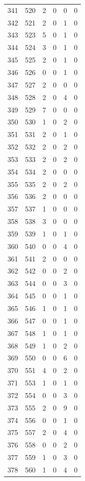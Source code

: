 \documentclass[
  letterpaper,
  DIV=11,
  numbers=noendperiod]{scrreprt}
\begin{document}
\begin{longtable}[]{@{}rrrrrr@{}}
341 & 520 & 2 & 0 & 0 & 0 \\
342 & 521 & 2 & 0 & 1 & 0 \\
343 & 523 & 5 & 0 & 1 & 0 \\
344 & 524 & 3 & 0 & 1 & 0 \\
345 & 525 & 2 & 0 & 1 & 0 \\
346 & 526 & 0 & 0 & 1 & 0 \\
347 & 527 & 2 & 0 & 0 & 0 \\
348 & 528 & 2 & 0 & 4 & 0 \\
349 & 529 & 7 & 0 & 0 & 0 \\
350 & 530 & 1 & 0 & 2 & 0 \\
351 & 531 & 2 & 0 & 1 & 0 \\
352 & 532 & 2 & 0 & 2 & 0 \\
353 & 533 & 2 & 0 & 2 & 0 \\
354 & 534 & 2 & 0 & 0 & 0 \\
355 & 535 & 2 & 0 & 2 & 0 \\
356 & 536 & 2 & 0 & 0 & 0 \\
357 & 537 & 1 & 0 & 0 & 0 \\
358 & 538 & 3 & 0 & 0 & 0 \\
359 & 539 & 1 & 0 & 1 & 0 \\
360 & 540 & 0 & 0 & 4 & 0 \\
361 & 541 & 2 & 0 & 0 & 0 \\
362 & 542 & 0 & 0 & 2 & 0 \\
363 & 544 & 0 & 0 & 3 & 0 \\
364 & 545 & 0 & 0 & 1 & 0 \\
365 & 546 & 1 & 0 & 1 & 0 \\
366 & 547 & 0 & 0 & 1 & 0 \\
367 & 548 & 1 & 0 & 1 & 0 \\
368 & 549 & 1 & 0 & 2 & 0 \\
369 & 550 & 0 & 0 & 6 & 0 \\
370 & 551 & 4 & 0 & 2 & 0 \\
371 & 553 & 1 & 0 & 1 & 0 \\
372 & 554 & 0 & 0 & 3 & 0 \\
373 & 555 & 2 & 0 & 9 & 0 \\
374 & 556 & 0 & 0 & 1 & 0 \\
375 & 557 & 2 & 0 & 4 & 0 \\
376 & 558 & 0 & 0 & 2 & 0 \\
377 & 559 & 1 & 0 & 3 & 0 \\
378 & 560 & 1 & 0 & 4 & 0 \\

\end{longtable}
\end{document}
